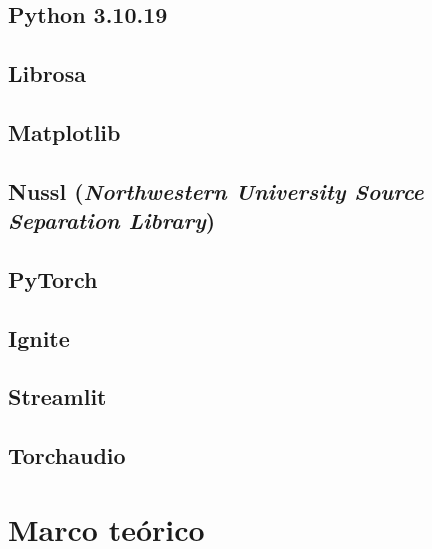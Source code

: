 \documentclass[a4paper,11pt]{memoir}
\begin{document}
\section{Python 3.10.19}

%
\section{Librosa}

\section{Matplotlib}

\section{Nussl (\textit{Northwestern University Source Separation Library})}

%
\section{PyTorch}

\section{Ignite}

\section{Streamlit}

\section{Torchaudio}

\cleardoublepage

\chapter{Marco teórico}

\end{document}
